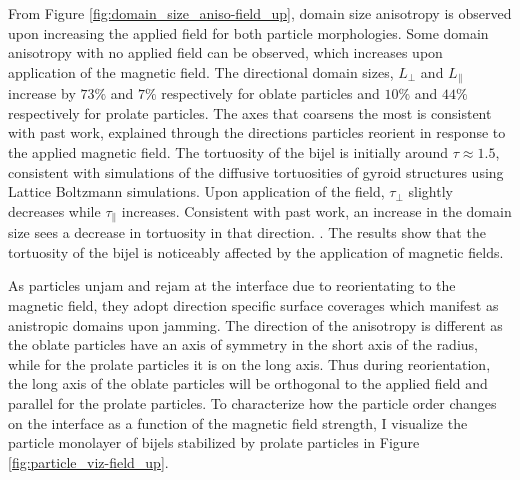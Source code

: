 From Figure \ref{fig:domain_size_aniso-field_up}, domain
size anisotropy is observed upon increasing the applied field
for both particle morphologies. Some domain anisotropy with no applied field can be observed, 
which increases upon application of the magnetic field. The directional domain sizes,
$L_{\perp}$ and $L_{\parallel}$ increase by $73\%$ and $7\%$
respectively for oblate particles and $10\%$ and $44\%$ respectively
for prolate particles. The axes that coarsens the most is consistent
with past work, explained through the directions particles reorient in
response to the applied magnetic field. The
tortuosity of the bijel is initially around $\tau \approx 1.5$,
consistent with simulations of the diffusive tortuosities of gyroid
structures using Lattice Boltzmann simulations.
\cite{luo_macroscopic_2020} Upon application of the field,
$\tau_{\perp}$ slightly decreases while $\tau_{\parallel}$
increases. Consistent with past work, an increase in the domain size sees a decrease in
tortuosity in that direction. \cite{karthikeyan_formation_2024}. The results show that the
tortuosity of the bijel is noticeably affected by the application of
magnetic fields.

As particles unjam and rejam at the interface due to reorientating to
the magnetic field, they adopt direction specific surface coverages
which manifest as anistropic domains upon jamming. The direction of the
anisotropy is different as the oblate particles have an axis of symmetry
in the short axis of the radius, while for the prolate particles it is
on the long axis. Thus during reorientation, the long axis of the oblate
particles will be orthogonal to the applied field and parallel for the
prolate particles. To characterize how the particle order changes on the
interface as a function of the magnetic field strength, I visualize the
particle monolayer of bijels stabilized by prolate particles in Figure
\ref{fig:particle_viz-field_up}.

